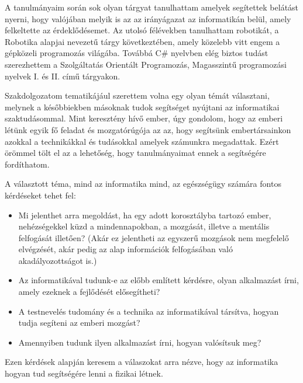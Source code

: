 \documentclass[tocnopagenum]{thesis-ekf}
\theoremstyle{definition}
\theoremstyle{remark}
\begin{document}
	A tanulmányaim során sok olyan tárgyat tanulhattam amelyek segítettek belátást nyerni, hogy valójában melyik is az az irányágazat az informatikán belül, amely felkeltette az érdeklődésemet. Az utolsó félévekben tanulhattam robotikát, a Robotika alapjai nevezetű tárgy következtében, amely közelebb vitt engem a gépközeli programozás világába. Továbbá C\# nyelvben elég biztos tudást szerezhettem a Szolgáltatás Orientált Programozás, Magasszintű programozási nyelvek I. és II. című tárgyakon.
	\par
	Szakdolgozatom tematikájául szerettem volna egy olyan témát választani, melynek a későbbiekben másoknak tudok segítséget nyújtani az informatikai szaktudásommal.
	Mint keresztény hívő ember, úgy gondolom, hogy az emberi létünk egyik fő feladat és mozgatórúgója az az, hogy segítsünk embertársainkon azokkal a technikákkal és tudásokkal amelyek számunkra megadattak. Ezért örömmel tölt el az a lehetőség, hogy tanulmányaimat ennek a segítségére fordíthatom. 
	\par
	A választott téma, mind az informatika mind, az egészségügy számára fontos kérdéseket tehet fel:
	\begin{itemize}
		\item  Mi jelenthet arra megoldást, ha egy adott korosztályba tartozó ember, nehézségekkel küzd a mindennapokban, a mozgását, illetve a mentális felfogását illetően? (Akár ez jelentheti az egyszerű mozgások nem megfelelő elvégzését, akár pedig az alap információk felfogásában való akadályozottságot is.)
		\item  Az informatikával tudunk-e az előbb említett kérdésre, olyan alkalmazást írni, amely ezeknek a fejlődését elősegítheti?
		\item A testnevelés tudomány és a technika az informatikával társítva, hogyan tudja segíteni az emberi mozgást?
		\item Amennyiben tudunk ilyen alkalmazást írni, hogyan valósítsuk meg?
	
	\end{itemize}
 	Ezen kérdések alapján keresem a válaszokat arra nézve, hogy az informatika hogyan tud segítségére lenni a fizikai létnek. 
 
\end{document}

